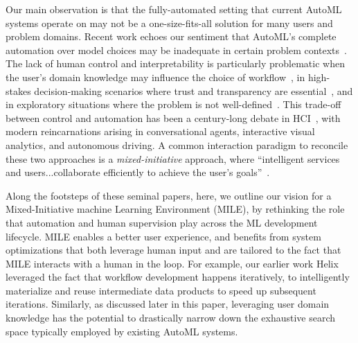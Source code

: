 \documentclass[11pt,dvipdfmx]{article}
\newcommand{\system}{{\sf MILE}\xspace}
\newcommand{\helix}{{\sc Helix}\xspace}
\begin{document}
\par Our main observation is that the fully-automated setting that current AutoML systems operate on may not be a one-size-fits-all solution for many users and problem domains. Recent work echoes our sentiment that AutoML's complete automation over model choices may be inadequate in certain problem contexts~\cite{Gil2019,Wang2019}. The lack of human control and interpretability is particularly problematic when the user's domain knowledge may influence the choice of workflow~\cite{Gil2019}, in high-stakes decision-making scenarios where trust and transparency are essential~\cite{Wang2019}, and in exploratory situations where the problem is not well-defined~\cite{Cashman2018}. This trade-off between control and automation has been a century-long debate in HCI~\cite{Horvitz1999,Heer2019,Shneiderman1997,Amershi2019AI}, with modern reincarnations arising in conversational agents, interactive visual analytics, and autonomous driving. A common interaction paradigm to reconcile these two approaches is a {\em mixed-initiative} approach, where ``intelligent services and users...collaborate efficiently to achieve the user's goals''~\cite{Horvitz1999}.
\par Along the footsteps of these seminal papers, here, we outline our vision for a Mixed-Initiative machine Learning Environment (\system), by rethinking the role that automation and human supervision play across the ML development lifecycle. \system enables a better user experience, and benefits from system optimizations that both leverage human input and are tailored to the fact that \system interacts with a human in the loop. For example, our earlier work \helix~\cite{xin2018helix} leveraged the fact that workflow development happens iteratively, to intelligently materialize and reuse intermediate data products to speed up subsequent iterations. Similarly, as discussed later in this paper, leveraging user domain knowledge has the potential to drastically narrow down the exhaustive search space typically employed by existing AutoML systems. 
\end{document}
